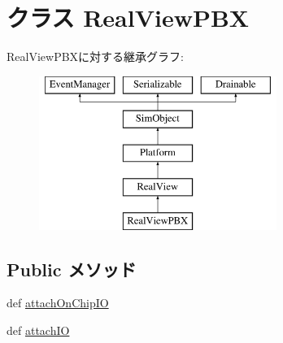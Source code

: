 \hypertarget{classRealView_1_1RealViewPBX}{
\section{クラス RealViewPBX}
\label{classRealView_1_1RealViewPBX}
}
RealViewPBXに対する継承グラフ:\begin{figure}[H]
\begin{center}
\leavevmode
\includegraphics[height=5cm]{classRealView_1_1RealViewPBX}
\end{center}
\end{figure}
\subsection*{Public メソッド}
\begin{DoxyCompactItemize}
\item 
def \hyperlink{classRealView_1_1RealViewPBX_abd74cec934f25d2881d5fdd0d5e7f512}{attachOnChipIO}
\item 
def \hyperlink{classRealView_1_1RealViewPBX_ac750675f6d6de3ad52f8c5b03ee45a65}{attachIO}
\end{DoxyCompactItemize}
